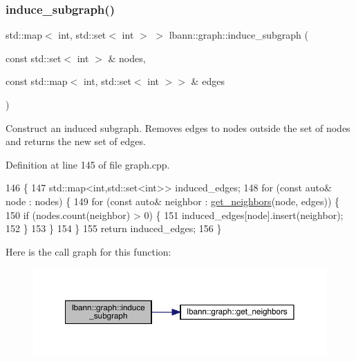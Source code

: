 \subsubsection{\texorpdfstring{induce\+\_\+subgraph()}{induce\_subgraph()}}
{\footnotesize\ttfamily std\+::map$<$ int, std\+::set$<$ int $>$ $>$ lbann\+::graph\+::induce\+\_\+subgraph (\begin{DoxyParamCaption}\item[{const std\+::set$<$ int $>$ \&}]{nodes,  }\item[{const std\+::map$<$ int, std\+::set$<$ int $>$$>$ \&}]{edges }\end{DoxyParamCaption})}

Construct an induced subgraph. Removes edges to nodes outside the set of nodes and returns the new set of edges. 

Definition at line 145 of file graph.\+cpp.


\begin{DoxyCode}
146                                                                                   \{
147   std::map<int,std::set<int>> induced\_edges;
148   \textcolor{keywordflow}{for} (\textcolor{keyword}{const} \textcolor{keyword}{auto}& node : nodes) \{
149     \textcolor{keywordflow}{for} (\textcolor{keyword}{const} \textcolor{keyword}{auto}& neighbor : \hyperlink{namespacelbann_1_1graph_ad305e0d104d25d9cb1e63a4b93c0847c}{get\_neighbors}(node, edges)) \{
150       \textcolor{keywordflow}{if} (nodes.count(neighbor) > 0) \{
151         induced\_edges[node].insert(neighbor);
152       \}
153     \}
154   \}
155   \textcolor{keywordflow}{return} induced\_edges;
156 \}
\end{DoxyCode}
Here is the call graph for this function\+:\nopagebreak
\begin{figure}[H]
\begin{center}
\leavevmode
\includegraphics[width=350pt]{namespacelbann_1_1graph_a54de9f8e26046c834acfc5436a93b66b_cgraph}
\end{center}
\end{figure}
\mbox{\label{namespacelbann_1_1graph_ac9c1819b38f8bc514ab24ac8778f840b}} 
